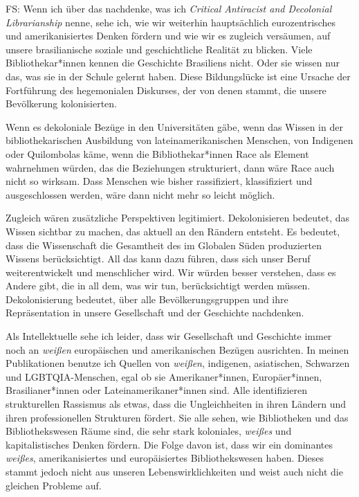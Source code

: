 \documentclass[a4paper,
fontsize=11pt,
oneside,
numbers=noperiodatend,
parskip=half-,
bibliography=totoc,
final
]{scrartcl}
\begin{document}
FS: Wenn ich über das nachdenke, was ich \emph{Critical Antiracist and
Decolonial Librarianship} nenne, sehe ich, wie wir weiterhin
hauptsächlich eurozentrisches und amerikanisiertes Denken fördern und
wie wir es zugleich versäumen, auf unsere brasilianische soziale und
geschichtliche Realität zu blicken. Viele Bibliothekar*innen kennen die
Geschichte Brasiliens nicht. Oder sie wissen nur das, was sie in der
Schule gelernt haben. Diese Bildungslücke ist eine Ursache der
Fortführung des hegemonialen Diskurses, der von denen stammt, die unsere
Bevölkerung kolonisierten.

Wenn es dekoloniale Bezüge in den Universitäten gäbe, wenn das Wissen in
der bibliothekarischen Ausbildung von lateinamerikanischen Menschen, von
Indigenen oder Quilombolas käme, wenn die Bibliothekar*innen Race als
Element wahrnehmen würden, das die Beziehungen strukturiert, dann wäre
Race auch nicht so wirksam. Dass Menschen wie bisher rassifiziert,
klassifiziert und ausgeschlossen werden, wäre dann nicht mehr so leicht
möglich.

Zugleich wären zusätzliche Perspektiven legitimiert. Dekolonisieren
bedeutet, das Wissen sichtbar zu machen, das aktuell an den Rändern
entsteht. Es bedeutet, dass die Wissenschaft die Gesamtheit des im
Globalen Süden produzierten Wissens berücksichtigt. All das kann dazu
führen, dass sich unser Beruf weiterentwickelt und menschlicher wird.
Wir würden besser verstehen, dass es Andere gibt, die in all dem, was
wir tun, berücksichtigt werden müssen. Dekolonisierung bedeutet, über
alle Bevölkerungsgruppen und ihre Repräsentation in unsere Gesellschaft
und der Geschichte nachdenken.

Als Intellektuelle sehe ich leider, dass wir Gesellschaft und Geschichte
immer noch an \emph{weißen} europäischen und amerikanischen Bezügen
ausrichten. In meinen Publikationen benutze ich Quellen von
\emph{weißen}, indigenen, asiatischen, Schwarzen und LGBTQIA-Menschen,
egal ob sie Amerikaner*innen, Europäer*innen, Brasilianer*innen oder
Lateinamerikaner*innen sind. Alle identifizieren strukturellen Rassismus
als etwas, dass die Ungleichheiten in ihren Ländern und ihren
professionellen Strukturen fördert. Sie alle sehen, wie Bibliotheken und
das Bibliothekswesen Räume sind, die sehr stark koloniales,
\emph{weißes} und kapitalistisches Denken fördern. Die Folge davon ist,
dass wir ein dominantes \emph{weißes}, amerikanisiertes und
europäisiertes Bibliothekswesen haben. Dieses stammt jedoch nicht aus
unseren Lebenswirklichkeiten und weist auch nicht die gleichen Probleme
auf.
\end{document}
